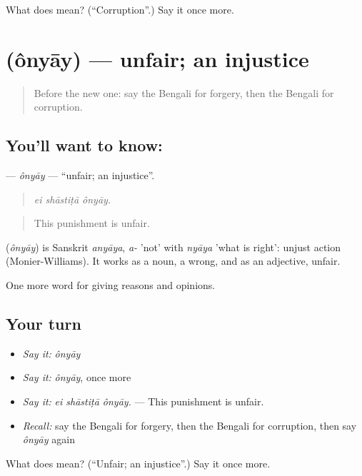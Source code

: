 \begin{tcolorbox}[breakable,colback=teal!4,colframe=teal!35!black,title={Before you move on}]
What does  mean? (\textquotedblleft{}Corruption\textquotedblright{}.) Say it once more.
\end{tcolorbox}
\section[\texorpdfstring{\bn{অন্যায়} (ônyāy)}{অন্যায় (ônyāy)}]{ (ônyāy) — unfair; an injustice}

\label{lesson:BN-C341-onyay}



\begin{quote}
Before the new one: say the Bengali for forgery, then the Bengali for corruption.
\end{quote}

\subsection*{You'll want to know: }
\textbf{} — \emph{ônyāy} — \textquotedblleft{}unfair; an injustice\textquotedblright{}.

\begin{quote}
  
\end{quote}

\begin{quote}
\emph{ei shāstiṭā ônyāy.}
\end{quote}

\begin{quote}
This punishment is unfair.
\end{quote}

\begin{cousinweb}
\textbf{} (\emph{ônyāy}) is Sanskrit \emph{anyāya}, \emph{a-} 'not' with \emph{nyāya} 'what is right': unjust action (Monier-Williams). It works as a noun, a wrong, and as an adjective, unfair.
\end{cousinweb}

\begin{grammarlens}[title={What you've built}]
One more word for giving reasons and opinions.
\end{grammarlens}

\subsection*{Your turn}
\begin{itemize}
\raggedright
  \item \emph{Say it:} \emph{ônyāy}
  \item \emph{Say it:} \emph{ônyāy}, once more
  \item \emph{Say it:} \emph{ei shāstiṭā ônyāy.} — This punishment is unfair.
  \item \emph{Recall:} say the Bengali for forgery, then the Bengali for corruption, then say \emph{ônyāy} again
\end{itemize}

\begin{tcolorbox}[breakable,colback=teal!4,colframe=teal!35!black,title={Before you move on}]
What does  mean? (\textquotedblleft{}Unfair; an injustice\textquotedblright{}.) Say it once more.
\end{tcolorbox}
